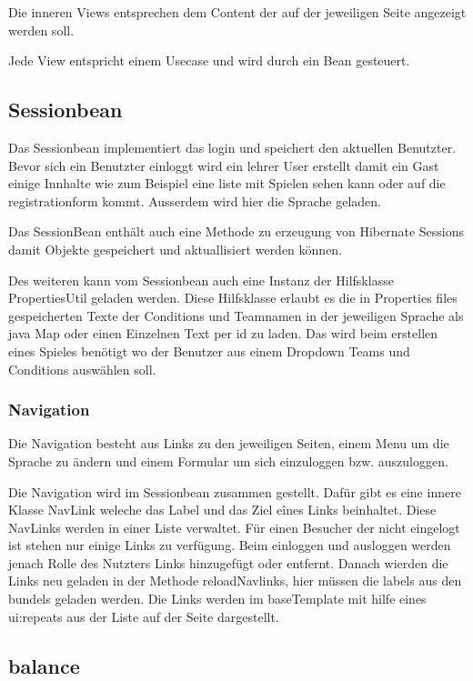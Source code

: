\documentclass[a4paper, abstracton]{scrartcl}
\begin{document}
  Die inneren Views entsprechen dem Content der auf der jeweiligen Seite
  angezeigt werden soll.
  
  Jede View entspricht einem Usecase und wird durch ein Bean gesteuert.


\subsection{Sessionbean}
  Das Sessionbean implementiert das login und speichert den aktuellen Benutzter.
  Bevor sich ein Benutzter einloggt wird ein lehrer User erstellt damit ein Gast
  einige Innhalte wie zum Beispiel eine liste mit Spielen sehen kann oder auf die
  registrationform kommt.
  Ausserdem wird hier die Sprache geladen.
  
  Das SessionBean enthält auch eine Methode zu erzeugung von Hibernate Sessions
  damit Objekte gespeichert und aktuallisiert werden können.
  
  Des weiteren kann vom Sessionbean auch eine Instanz der Hilfsklasse PropertiesUtil
  geladen werden. Diese Hilfsklasse erlaubt es die in Properties files gespeicherten
  Texte der Conditions und Teamnamen in der jeweiligen Sprache als java Map 
  oder einen Einzelnen Text per id zu laden.
  Das wird beim erstellen eines Spieles benötigt wo der Benutzer aus einem Dropdown
  Teams und Conditions auswählen soll.
  
\subsubsection{Navigation}
  Die Navigation besteht aus Links zu den jeweiligen Seiten, einem Menu um die
  Sprache zu ändern und einem Formular um sich einzuloggen bzw. auszuloggen.
  
  Die Navigation wird im Sessionbean zusammen gestellt. Dafür gibt es eine innere
  Klasse NavLink weleche das Label und das Ziel eînes Links beinhaltet.
  Diese NavLinks werden in einer Liste verwaltet. Für einen Besucher der nicht
  eingelogt ist stehen nur einige Links zu verfügung. Beim einloggen und ausloggen
  werden jenach Rolle des Nutzters Links hinzugefügt oder entfernt.
  Danach wierden die Links neu geladen in der Methode reloadNavlinks, hier müssen
  die labels aus den bundels geladen werden.
  Die Links werden im baseTemplate mit hilfe eines ui:repeats aus der Liste auf
  der Seite dargestellt.

\subsection{balance}
  
\end{document}
